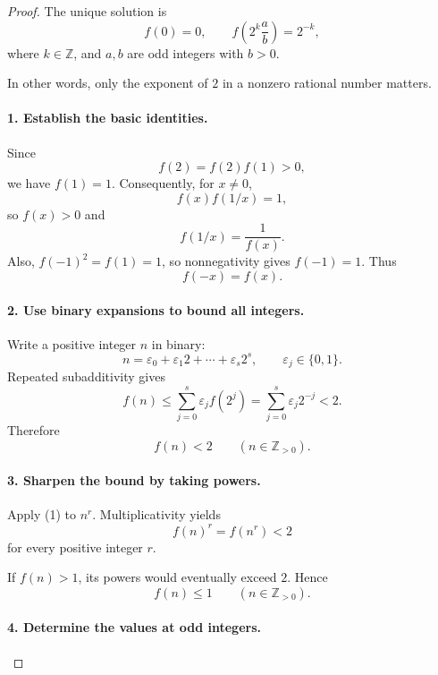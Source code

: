 
\begin{dlsummary}[title={\bfseries Solution 53. When Even Numbers Become Smaller},breakable]

\begin{proof}
The unique solution is
\[
\boxed{
f(0)=0,\qquad
f\!\left(2^k\frac ab\right)=2^{-k},
}
\]
where \(k\in\mathbb Z\), and \(a,b\) are odd integers with \(b>0\).

In other words, only the exponent of \(2\) in a nonzero rational number matters.

\paragraph{1. Establish the basic identities.}

Since
\[
f(2)=f(2)f(1)>0,
\]
we have \(f(1)=1\). Consequently, for \(x\ne0\),
\[
f(x)f(1/x)=1,
\]
so \(f(x)>0\) and
\[
f(1/x)=\frac1{f(x)}.
\]
Also, \(f(-1)^2=f(1)=1\), so nonnegativity gives \(f(-1)=1\). Thus
\[
f(-x)=f(x).
\]

\paragraph{2. Use binary expansions to bound all integers.}

Write a positive integer \(n\) in binary:
\[
n=\varepsilon_0+\varepsilon_1 2+\cdots+\varepsilon_s2^s,
\qquad \varepsilon_j\in\{0,1\}.
\]
Repeated subadditivity gives
\[
f(n)\le\sum_{j=0}^s\varepsilon_j f(2^j)
=\sum_{j=0}^s\varepsilon_j2^{-j}<2.
\]
Therefore
\[
\boxed{f(n)<2\qquad(n\in\mathbb Z_{>0}).} \tag{1}
\]

\paragraph{3. Sharpen the bound by taking powers.}

Apply (1) to \(n^r\). Multiplicativity yields
\[
f(n)^r=f(n^r)<2
\]
for every positive integer \(r\).

If \(f(n)>1\), its powers would eventually exceed \(2\). Hence
\[
\boxed{f(n)\le1\qquad(n\in\mathbb Z_{>0}).} \tag{2}
\]

\paragraph{4. Determine the values at odd integers.}


\end{proof}
\end{dlsummary}
